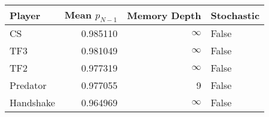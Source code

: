 \begin{tabular}{lrrl}
\toprule
    Player &  Mean $p_{N-1}$ &  Memory Depth & Stochastic \\
\midrule
        CS &        0.985110 &            \(\infty\) &      False \\
       TF3 &        0.981049 &            \(\infty\) &      False \\
       TF2 &        0.977319 &            \(\infty\) &      False \\
  Predator &        0.977055 &             9 &      False \\
 Handshake &        0.964969 &            \(\infty\) &      False \\
\bottomrule
\end{tabular}
